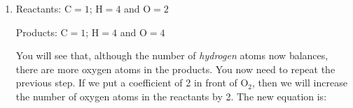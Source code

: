 {\begin{mdframed}[linewidth=4, leftmargin=40, rightmargin=40]
\begin{exercise}
\begin{enumerate}[noitemsep, label=\textbf{Step} \textbf{\arabic*}. ]
        \item  
        \label{m38726*id64230}Reactants: \begin{math}\mathrm{C}=1\end{math}; \begin{math}\mathrm{H}=4\end{math} and \begin{math}\mathrm{O}=2\end{math}\par 
        \label{m38726*id64234}Products: \begin{math}\mathrm{C}=1\end{math}; \begin{math}\mathrm{H}=4\end{math} and \begin{math}\mathrm{O}=4\end{math} \par 
        \label{m38726*id64238}You will see that, although the number of \textsl{hydrogen} atoms now balances, there are more oxygen atoms in the products. You now need to repeat the previous step. If we put a coefficient of 2 in front of \begin{math}\mathrm{O}{}_{2}\end{math}, then we will increase the number of oxygen atoms in the reactants by 2. The new equation is:
        \label{m38726*id644352}\nopagebreak\noindent{}
    

\end{enumerate}
\end{exercise}
\end{mdframed}}
